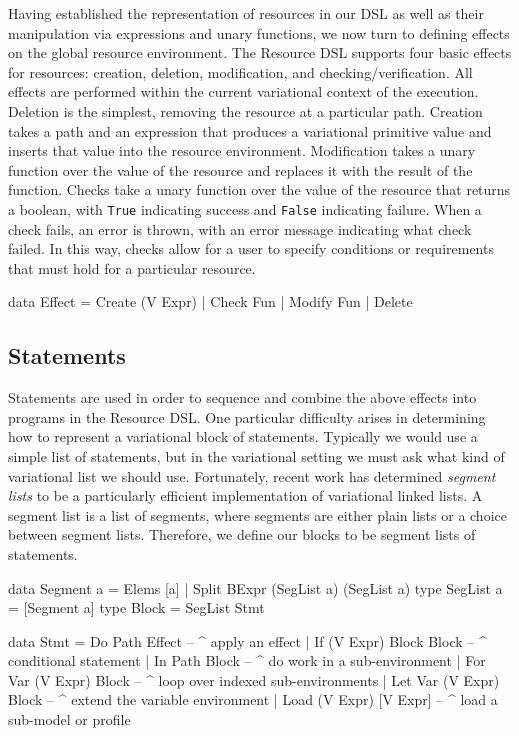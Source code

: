 \documentclass[letterpaper,10pt,onecolumn]{article}
\newcommand{\prog}[1]{{\small\texttt{#1}}}
\begin{document}
Having established the representation of resources in our DSL as well as their manipulation via expressions and unary functions,
we now turn to defining effects on the global resource environment.
The Resource DSL supports four basic effects for resources: creation, deletion, modification, and checking/verification. All effects are performed
within the current variational context of the execution. Deletion is the
simplest, removing the resource at a particular path. Creation takes a path and an expression that produces a variational primitive value
and inserts that value into the resource environment. Modification takes a unary function over the value of the resource and replaces it
with the result of the function. Checks take a unary function over the value of the resource that returns a boolean, with \prog{True} indicating
success and \prog{False} indicating failure. When a check fails, an error is thrown, with an error message indicating what check failed.
In this way, checks allow for a user to specify conditions or requirements that must hold for a particular resource.

\begin{program}
data Effect
     = Create (V Expr)
     | Check  Fun
     | Modify Fun
     | Delete
\end{program}

\subsection{Statements}

Statements are used in order to sequence and combine the above effects into programs in the Resource DSL.
One particular difficulty arises in determining how to represent a variational block of statements. Typically we
would use a simple list of statements, but in the variational setting we must ask what kind of variational list
we should use. Fortunately, recent work \cite{karltodo} has determined \emph{segment lists} to be a particularly
efficient implementation of variational linked lists. A segment list is a list of segments, where segments are either
plain lists or a choice between segment lists. Therefore, we define our blocks to be segment lists of
statements.

\begin{program}
data Segment a = Elems [a] | Split BExpr (SegList a) (SegList a)
type SegList a = [Segment a]
type Block = SegList Stmt

data Stmt
     = Do Path Effect       -- ^ apply an effect
     | If (V Expr) Block Block  -- ^ conditional statement
     | In Path Block        -- ^ do work in a sub-environment
     | For Var (V Expr) Block   -- ^ loop over indexed sub-environments
     | Let Var (V Expr) Block   -- ^ extend the variable environment
     | Load (V Expr) [V Expr] -- ^ load a sub-model or profile
\end{program}




\end{document}

